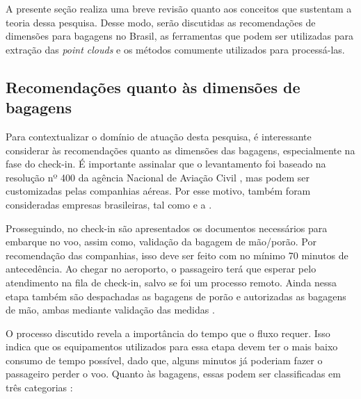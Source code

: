     A presente seção realiza uma breve revisão quanto aos conceitos que sustentam a teoria dessa pesquisa. Desse modo, serão discutidas as recomendações de dimensões para bagagens no Brasil, as ferramentas que podem ser utilizadas para extração das \textit{point clouds} e os métodos comumente utilizados para processá-las.

\subsection{Recomendações quanto às dimensões de bagagens}
\label{subsec_processo Processo de embarque}
    
    Para contextualizar o domínio de atuação desta pesquisa, é interessante considerar às recomendações quanto as dimensões das bagagens, especialmente na fase do check-in. É importante assinalar que o levantamento foi baseado na resolução nº 400 da agência Nacional de Aviação Civil \cite{anac_2022_resoluo}, mas podem ser customizadas pelas companhias aéreas. Por esse motivo, também foram consideradas empresas brasileiras, tal como  e a .
    
	Prosseguindo, no check-in são apresentados os documentos necessários para embarque no voo, assim como, validação da bagagem de mão/porão. Por recomendação das companhias, isso deve ser feito com no mínimo 70 minutos de antecedência. Ao chegar no aeroporto, o passageiro terá que esperar pelo atendimento na fila de check-in, salvo se foi um processo remoto. Ainda nessa etapa também são despachadas as bagagens de porão e autorizadas as bagagens de mão, ambas mediante validação das medidas \cite{denis_2021_bagagem, daniel_2021_como}.
	
    O processo discutido revela a importância do tempo que o fluxo requer. Isso indica que os equipamentos utilizados para essa etapa devem ter o mais baixo consumo de tempo possível, dado que, alguns minutos já poderiam fazer o passageiro perder o voo. Quanto às bagagens, essas podem ser classificadas em três categorias \cite{azul_2022_bagagem}:
    
